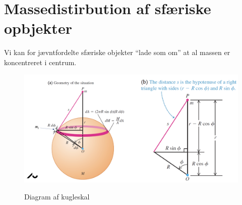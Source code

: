 \section{Massedistirbution af sfæriske opbjekter}
Vi kan for jævntfordelte sfæriske objekter ``lade som om'' at al massen er koncentreret i centrum.

\begin{figure} [ht]
  \centering
  \caption{Diagram af kugleskal}
  \includegraphics[width=0.7\linewidth]{./figures/F20_1.png}
  \label{fig:F20_1}
\end{figure}

